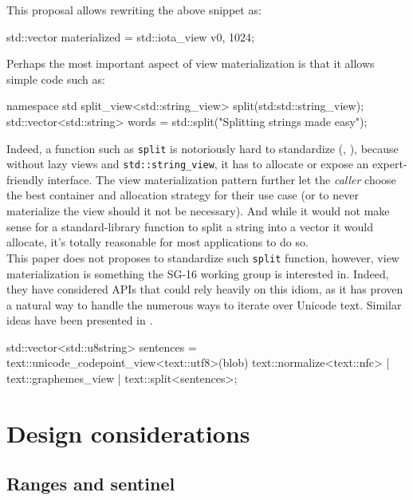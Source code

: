 \documentclass{wg21}
\newcommand{\cc}[1]{\texttt{#1}}
\begin{document}
This proposal allows rewriting the above snippet as:

\begin{codeblock}
    std::vector materialized = std::iota_view v{0, 1024};
\end{codeblock}


Perhaps the most important aspect of view materialization is that it allows simple code such as:

\begin{codeblock}
    namespace std {
        split_view<std::string_view> split(std:std::string_view);
    }
    std::vector<std::string> words = std::split("Splitting strings made easy");
\end{codeblock}

Indeed, a function such as \cc{split} is notoriously hard to standardize (\cite{P0540},  \cite{N3593}), because without lazy views and \cc{std::string_view}, it has to allocate or expose an expert-friendly interface.
The view materialization pattern further let the \emph{caller} choose the best container and allocation strategy for their use case (or to never materialize the view should it not be necessary).
And while it would not make sense for a standard-library function to split a string into a vector it would allocate, it's totally reasonable for most applications to do so.\\

This paper does not proposes to standardize such \cc{split} function, however, view materialization is something the SG-16 working group is interested in.
Indeed, they have considered APIs that could rely heavily on this idiom, as it has proven a natural way to handle the numerous ways to iterate over Unicode text.
Similar ideas have been presented in \cite{P1004}.

\begin{codeblock}
    std::vector<std::u8string> sentences =
        text::unicode_codepoint_view<text::utf8>(blob)
        text::normalize<text::nfc> |
        text::graphemes_view |
        text::split<sentences>;
\end{codeblock}

\section{Design considerations}


\subsection{Ranges and sentinel}
\end{document}
